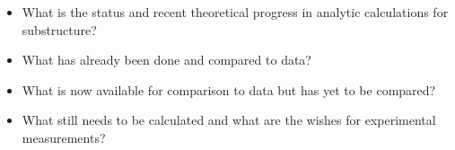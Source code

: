 \label{calculations}

\begin{itemize}
\item What is the status and recent theoretical progress in analytic calculations for substructure?
\item What has already been done and compared to data?
\item What is now available for comparison to data but has yet to be compared?
\item What still needs to be calculated and what are the wishes for experimental measurements?
\end{itemize}